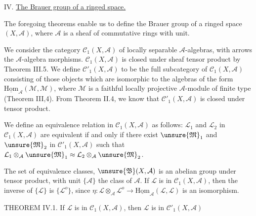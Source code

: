 IV. \uline{The Brauer group of a ringed space.}

The foregoing theorems enable us to define the Brauer group of a ringed space $(X,\mathcal{A})$, where $\mathcal{A}$ is a sheaf of commutative rings with unit.

We consider the category $\mathcal{C}_1(X,\mathcal{A})$ of locally separable $\mathcal{A}$-algebras, with arrows the $\mathcal{A}$-algebra morphisms. $\mathcal{C}_1(X,\mathcal{A})$ is closed under sheaf tensor product by Theorem III.5. We define $\mathcal{C}'_1(X,\mathcal{A})$ to be the full subcategory of $\mathcal{C}_1(X,\mathcal{A})$ consisting of those objects which are isomorphic to the algebras of the form $\underline{\mathrm{Hom}}_{\mathcal{A}}(\mathcal{M},\mathcal{M})$, where $\mathcal{M}$ is a faithful locally projective $\mathcal{A}$-module of finite type (Theorem III,4). From Theorem II.4, we know that $\mathcal{C}'_1(X,\mathcal{A})$ is closed under tensor product.

We define an equivalence relation in $\mathcal{C}_1(X,\mathcal{A})$ as follows: $\mathcal{L}_1$ and $\mathcal{L}_2$ in $\mathcal{C}_1(X,\mathcal{A})$ are equivalent if and only if there exist $\unsure{\mathfrak{M}}_1$ and $\unsure{\mathfrak{M}}_2$ in $\mathcal{C}'_1(X,\mathcal{A})$ such that $\mathcal{L}_1\otimes_{\mathcal{A}}\unsure{\mathfrak{M}}_1\approx\mathcal{L}_2\otimes_{\mathcal{A}}\unsure{\mathfrak{M}}_2$.

The set of equivalence classes, $\unsure{\mathfrak{B}}(X,\mathcal{A})$ is an abelian group under tensor product, with unit $\{\mathcal{A}\}$ the class of $\mathcal{A}$. If $\mathcal{L}$ is in $\mathcal{C}_1(X,\mathcal{A})$, then the inverse of $\{\mathcal{L}\}$ is $\{\mathcal{L}^o\}$, since $\eta:\mathcal{L}\otimes_{\mathcal{A}}\mathcal{L}^o\longrightarrow\underline{\mathrm{Hom}}_{\mathcal{A}}(\mathcal{L},\mathcal{L})$ is an isomorphism.

THEOREM IV.1. If $\mathcal{L}$ is in $\mathcal{C}_1(X,\mathcal{A})$, then $\mathcal{L}$ is in $\mathcal{C}'_1(X,\mathcal{A})$

